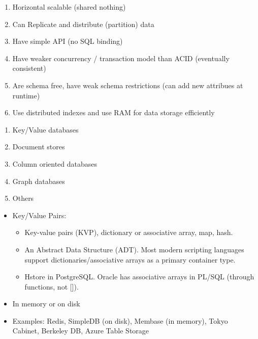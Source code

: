 \begin{breakbox}
\begin{enumerate}
	\item Horizontal scalable (shared nothing)
	\item Can Replicate and distribute (partition) data
	\item Have simple API (no SQL binding)
	\item Have weaker concurrency / transaction model than ACID (eventually consistent)
	\item Are schema free, have weak schema restrictions (can add new attribues at runtime)
	\item Use distributed indexes and use RAM for data storage efficiently
\end{enumerate}
\end{breakbox}

\begin{breakbox}
\begin{enumerate}
	\item Key/Value databases
	\item Document stores
	\item Column oriented databases
	\item Graph databases
	\item Others
\end{enumerate}
\end{breakbox}

\begin{breakbox}
\begin{itemize}
	\item Key/Value Pairs:
		\begin{itemize}
			\item Key-value pairs (KVP), dictionary or associative array, map, hash.
			\item An Abstract Data Structure (ADT). Most modern scripting languages support dictionaries/associative arrays as a primary container type.
			\item Hstore in PostgreSQL. Oracle has associative arrays in PL/SQL (through functions, not []).
		\end{itemize}
	\item In memory or on disk
	\item Examples: Redis, SimpleDB (on disk), Membase (in memory), Tokyo Cabinet, Berkeley DB, Azure Table Storage
\end{itemize}
\end{breakbox}

